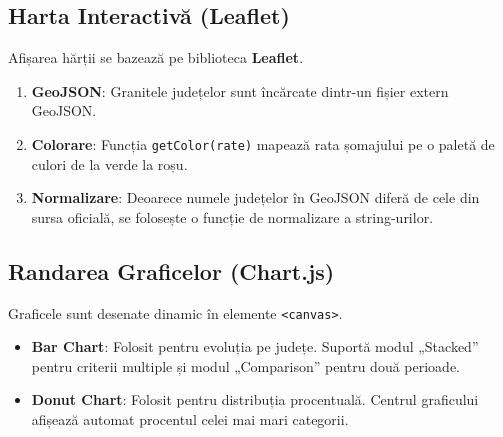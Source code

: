 \documentclass[12pt,a4paper]{article}
\begin{document}
\subsection{Harta Interactivă (Leaflet)}
Afișarea hărții se bazează pe biblioteca \textbf{Leaflet}.
\begin{enumerate}
    \item \textbf{GeoJSON}: Granitele județelor sunt încărcate dintr-un fișier extern GeoJSON.
    \item \textbf{Colorare}: Funcția \texttt{getColor(rate)} mapează rata șomajului pe o paletă de culori de la verde la roșu.
    \item \textbf{Normalizare}: Deoarece numele județelor în GeoJSON diferă de cele din sursa oficială, se folosește o funcție de normalizare a string-urilor.
\end{enumerate}

\subsection{Randarea Graficelor (Chart.js)}
Graficele sunt desenate dinamic în elemente \texttt{<canvas>}.
\begin{itemize}
    \item \textbf{Bar Chart}: Folosit pentru evoluția pe județe. Suportă modul „Stacked” pentru criterii multiple și modul „Comparison” pentru două perioade.
    \item \textbf{Donut Chart}: Folosit pentru distribuția procentuală. Centrul graficului afișează automat procentul celei mai mari categorii.
\end{itemize}
\end{document}
